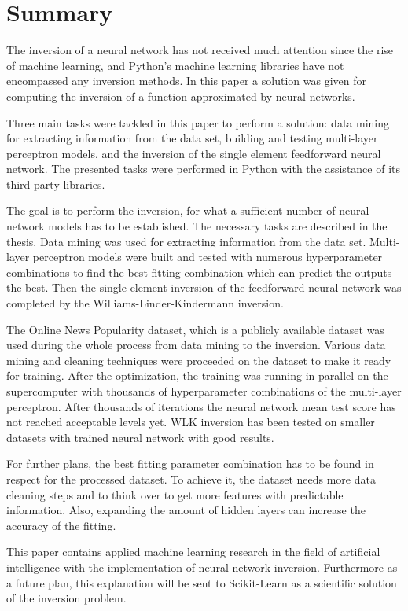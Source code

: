 \chapter{Summary}

The inversion of a neural network has not received much attention since the rise of machine learning, and Python's machine learning libraries have not encompassed any inversion methods. In this paper a solution was given for computing the inversion of a function approximated by neural networks. \medskip

Three main tasks were tackled in this paper to perform a solution: data mining for extracting information from the data set, building and testing multi-layer perceptron models, and the inversion of the single element feedforward neural network. The presented tasks were performed in Python with the assistance of its third-party libraries. \medskip

The goal is to perform the inversion, for what a sufficient number of neural network models has to be established. The necessary tasks are described in the thesis. Data mining was used for extracting information from the data set. Multi-layer perceptron models were built and tested with numerous hyperparameter combinations to find the best fitting combination which can predict the outputs the best. Then the single element inversion of the feedforward neural network was completed by the Williams-Linder-Kindermann inversion. \medskip

The Online News Popularity dataset, which is a publicly available dataset was used during the whole process from data mining to the inversion. Various data mining and cleaning techniques were proceeded on the dataset to make it ready for training. After the optimization, the training was running in parallel on the supercomputer with thousands of hyperparameter combinations of the multi-layer perceptron. After thousands of iterations the neural network mean test score has not reached acceptable levels yet. WLK inversion has been tested on smaller datasets with trained neural network with good results. \medskip

For further plans, the best fitting parameter combination has to be found in respect for the processed dataset. To achieve it, the dataset needs more data cleaning steps and to think over to get more features with predictable information. Also, expanding the amount of hidden layers can increase the accuracy of the fitting. \medskip

This paper contains applied machine learning research in the field of artificial intelligence with the implementation of neural network inversion. Furthermore as a future plan, this explanation will be sent to Scikit-Learn as a scientific solution of the inversion problem. 